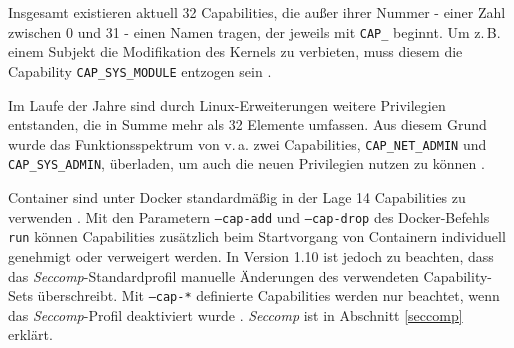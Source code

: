 \documentclass[../main.tex]{subfiles}
\begin{document}
			Insgesamt existieren aktuell 32 Capabilities, die außer ihrer Nummer - einer Zahl zwischen 0 und 31 - einen Namen tragen, der jeweils mit \texttt{CAP\_} beginnt. Um z.\,B. einem Subjekt die Modifikation des Kernels zu verbieten, muss diesem die Capability \texttt{CAP\_SYS\_MODULE} entzogen sein \cite[S.42]{SELinuxApparmor}.

			Im Laufe der Jahre sind durch Linux-Erweiterungen weitere Privilegien entstanden, die in Summe mehr als 32 Elemente umfassen. Aus diesem Grund wurde das Funktionsspektrum von v.\,a. zwei Capabilities, \texttt{CAP\_NET\_ADMIN} und \texttt{CAP\_SYS\_ADMIN}, überladen, um auch die neuen Privilegien nutzen zu können \cite[S.40f.]{SELinuxApparmor}.

			Container sind unter Docker standardmäßig in der Lage 14 Capabilities zu verwenden \cite{githubCapabilities}. Mit den Parametern \texttt{--cap-add} und \texttt{--cap-drop} des Docker-Befehls \texttt{run} können Capabilities zusätzlich beim Startvorgang von Containern individuell genehmigt oder verweigert werden. In Version 1.10 ist jedoch zu beachten, dass das \emph{Seccomp}-Standardprofil manuelle Änderungen des verwendeten Capability-Sets überschreibt. Mit \texttt{--cap-*} definierte Capabilities werden nur beachtet, wenn das \emph{Seccomp}-Profil deaktiviert wurde \cite{dockerRun}. \emph{Seccomp} ist in Abschnitt \ref{seccomp} erklärt.




\end{document}
